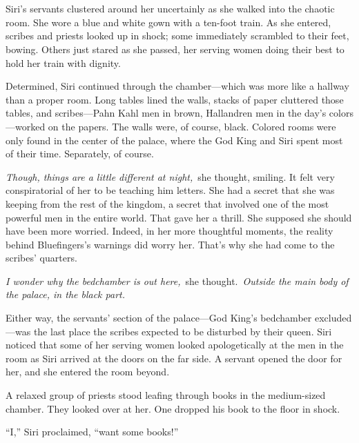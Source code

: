 \chapter{}

Siri’s servants clustered around her uncertainly as she walked into the chaotic room. She wore a blue and white gown with a ten-foot train. As she entered, scribes and priests looked up in shock; some immediately scrambled to their feet, bowing. Others just stared as she passed, her serving women doing their best to hold her train with dignity.

Determined, Siri continued through the chamber—which was more like a hallway than a proper room. Long tables lined the walls, stacks of paper cluttered those tables, and scribes—Pahn Kahl men in brown, Hallandren men in the day’s colors—worked on the papers. The walls were, of course, black. Colored rooms were only found in the center of the palace, where the God King and Siri spent most of their time. Separately, of course.

\textit{Though, things are a little different at night,}~she thought, smiling. It felt very conspiratorial of her to be teaching him letters. She had a secret that she was keeping from the rest of the kingdom, a secret that involved one of the most powerful men in the entire world. That gave her a thrill. She supposed she should have been more worried. Indeed, in her more thoughtful moments, the reality behind Bluefingers’s warnings did worry her. That’s why she had come to the scribes’ quarters.

\textit{I wonder why the bedchamber is out here,}~she thought.~\textit{Outside the main body of the palace, in the black part.}

Either way, the servants’ section of the palace—God King’s bedchamber excluded—was the last place the scribes expected to be disturbed by their queen. Siri noticed that some of her serving women looked apologetically at the men in the room as Siri arrived at the doors on the far side. A servant opened the door for her, and she entered the room beyond.

A relaxed group of priests stood leafing through books in the medium-sized chamber. They looked over at her. One dropped his book to the floor in shock.

“I,” Siri proclaimed, “want some books!”


